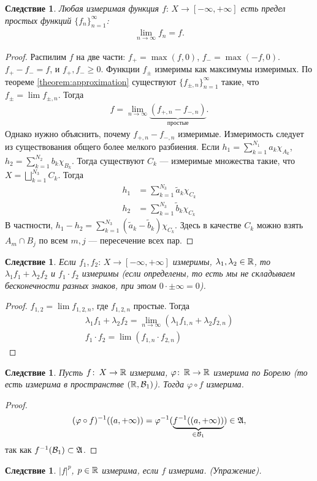 \documentclass[a4paper,14pt]{extarticle}
\newcounter{theoremCnt}
\theoremstyle{definition}
\theoremstyle{plain}
\theoremstyle{plain}
\theoremstyle{plain}
\newtheorem{crly}[theoremCnt]{Следствие}
\theoremstyle{plain}
\theoremstyle{definition}
\theoremstyle{definition}
\theoremstyle{definition}
\theoremstyle{definition}
\theoremstyle{definition}
\theoremstyle{definition}
\theoremstyle{plain}
\theoremstyle{plain}
\theoremstyle{plain}
\theoremstyle{plain}
\theoremstyle{definition}
\theoremstyle{definition}
\theoremstyle{definition}
\theoremstyle{definition}
\theoremstyle{definition}
\newcommand{\R}{\ensuremath \mathbb{R}}
\newcommand{\A}{\ensuremath \mathfrak{A}}
\begin{document}
\begin{crly}
 Любая измеримая функция $f \colon\, X \to [-\infty, +\infty] $ есть предел простых функций $\{f_{n}\}_{n=1}^{\infty} $: \begin{align*}
  \lim_{n \to \infty} f_n = f
 .\end{align*} 
\end{crly}
\begin{proof}
Распилим $f$ на две части: $f_+ = \max(f, 0)$, $f_- = \max(-f, 0)$. $f_+ - f_- = f$, и  $f_+, f_- \geqslant 0$. Функции $f_{\pm}$ измеримы как максимумы измеримых. По теореме \ref{theorem:approximation} существуют $\{f_{\pm,n}\}_{n=1}^{\infty} $ такие, что $f_{\pm} = \lim f_{\pm,n}$. Тогда \begin{align*}
  f = \lim_{n \to \infty} \underbrace{(f_{+,n} - f_{-,n})}_{\text{ простые }}
 .\end{align*} Однако нужно объяснить, почему $f_{+,n} - f_{-,n}$ измеримые. Измеримость следует из существования общего более мелкого разбиения. Если  $h_1 = \sum_{k=1}^{N_1} a_k \chi_{A_k}$, $h_2 = \sum_{k=1}^{N_2} b_k \chi_{B_k}$. Тогда существуют $C_k$ --- измеримые множества такие, что  $X = \bigsqcup_{k=1}^{N_3} C_k $. Тогда \begin{align*}
 h_1 &= \sum_{k=1}^{N_3} \tilde a_{k} \chi_{C_k} \\
 h_2 &= \sum_{k=1}^{N_3} \tilde b_{k} \chi_{C_k}
\end{align*} В частности, $h_1 - h_2 = \sum_{k=1}^{N_3} (\tilde a_k - \tilde b_k) \chi_{C_k}$. Здесь в качестве $C_k$ можно взять $A_m \cap B_j$ по всем $m,j$ --- пересечение всех пар.
\end{proof}
\begin{crly}
 Если $f_1,f_2 \colon\, X \to [-\infty, +\infty] $ измеримы, $\lambda_1, \lambda_2 \in \R$, то $\lambda_1 f_1 + \lambda_2 f_2$ и $f_1 \cdot f_2$ измеримы (если определены, то есть мы не складываем бесконечности разных знаков, при этом $0 \cdot \pm \infty = 0$).
\end{crly}
\begin{proof}
 $ f_{1,2} = \lim f_{1,2,n} $, где $f_{1,2,n}$ простые. Тогда \begin{align*}
  \lambda_1 f_1 + \lambda_2 f_2 = \lim_{n \to \infty} \left( \lambda_1 f_{1,n} + \lambda_2 f_{2,n} \right) \\
  f_1 \cdot f_2 = \lim (f_{1,n} \cdot f_{2,n})
 \end{align*} 
\end{proof}
\begin{crly}
 Пусть $f \colon\, X \to \R  $ измерима, $\varphi \colon\, \R \to \R  $ измерима по Борелю (то есть измерима в пространстве $(\R, \B_1)$). Тогда $\varphi \circ f$ измерима.
\end{crly}
\begin{proof}
 \begin{align*}
  (\varphi \circ f)^{-1} ((a, +\infty)) = \varphi^{-1} ( \underbrace{f^{-1}((a, +\infty))}_{\in \B_1} ) \in \A
 ,\end{align*} так как $f^{-1}(\B_1) \subset \A$.
\end{proof}
\begin{crly}
 $\left| f \right|^{p}$, $p \in \R$ измерима, если $f$ измерима. (Упражение).
\end{crly}
\end{document}
